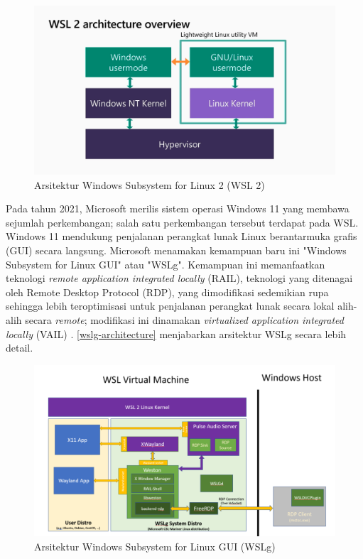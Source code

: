 \begin{figure}
    \centering
    \includegraphics[width=1\linewidth]{assets/wsl2-architecture-extracted-from-pendadaran-slides.png}
    \caption{Arsitektur Windows Subsystem for Linux 2 (WSL 2) \cite{youtube-new-wsl-architecture}}
    \label{wsl2-architecture}
\end{figure}


Pada tahun 2021, Microsoft merilis sistem operasi Windows 11 yang membawa sejumlah perkembangan; salah satu perkembangan tersebut terdapat pada WSL. Windows 11 mendukung penjalanan perangkat lunak Linux berantarmuka grafis (GUI) secara langsung. Microsoft menamakan kemampuan baru ini "Windows Subsystem for Linux GUI" atau "WSLg". Kemampuan ini memanfaatkan teknologi \textit{remote application integrated locally} (RAIL), teknologi yang ditenagai oleh Remote Desktop Protocol (RDP), yang dimodifikasi sedemikian rupa sehingga lebih teroptimisasi untuk penjalanan perangkat lunak secara lokal alih-alih secara \textit{remote}; modifikasi ini dinamakan \textit{virtualized application integrated locally} (VAIL) \cite{microsoft-devblogs-wslg-architecture}. \autoref{wslg-architecture} menjabarkan arsitektur WSLg secara lebih detail.

\begin{figure}
    \centering
    \includegraphics[width=1\linewidth]{assets/wslg-architecture.png}
    \caption{Arsitektur Windows Subsystem for Linux GUI (WSLg) \cite{microsoft-devblogs-wslg-architecture}}
    \label{wslg-architecture}
\end{figure}

